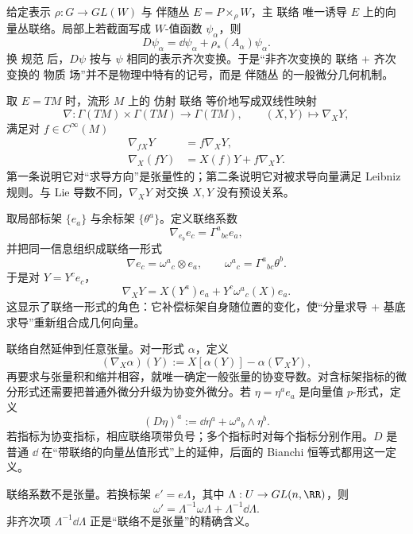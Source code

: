 给定表示 $\rho:G\to GL(W)$ 与 伴随丛 $E=P\times_\rho W$，主 联络 唯一诱导 $E$ 上的向量丛联络。局部上若截面写成 $W$-值函数 $\psi_\alpha$，则
\begin{equation*}D\psi_\alpha
=\dd\psi_\alpha+\rho_*(A_\alpha)\psi_\alpha.\end{equation*}
换 规范 后，$D\psi$ 按与 $\psi$ 相同的表示齐次变换。于是“非齐次变换的 联络 + 齐次变换的 物质 场”并不是物理中特有的记号，而是 伴随丛 的一般微分几何机制。

取 $E=TM$ 时，流形 $M$ 上的 仿射 联络 等价地写成双线性映射
\[
\nabla:\Gamma(TM)\times\Gamma(TM)\to\Gamma(TM),
\qquad
(X,Y)\mapsto\nabla_XY,
\]
满足对 $f\in C^\infty(M)$
\begin{align*}
\nabla_{fX}Y&=f\nabla_XY,\\
\nabla_X(fY)&=X(f)Y+f\nabla_XY.
\end{align*}
第一条说明它对“求导方向”是张量性的；第二条说明它对被求导向量满足 Leibniz 规则。与 Lie 导数不同，$\nabla_XY$ 对交换 $X,Y$ 没有预设关系。

取局部标架 $\{e_a\}$ 与余标架 $\{\theta^a\}$。定义联络系数
\begin{equation*}\nabla_{e_b}e_c=\Gamma^a{}_{bc}e_a,
\end{equation*}
并把同一信息组织成联络一形式
\begin{equation*}\nabla e_c=\omega^a{}_c\otimes e_a,
\qquad
\omega^a{}_c=\Gamma^a{}_{bc}\theta^b.
\end{equation*}
于是对 $Y=Y^ce_c$，
\[
\nabla_XY
=X(Y^a)e_a+Y^c\omega^a{}_c(X)e_a.
\]
这显示了联络一形式的角色：它补偿标架自身随位置的变化，使“分量求导 + 基底求导”重新组合成几何向量。

联络自然延伸到任意张量。对一形式 $\alpha$，定义
\[
(\nabla_X\alpha)(Y)
:=X[\alpha(Y)]-\alpha(\nabla_XY),
\]
再要求与张量积和缩并相容，就唯一确定一般张量的协变导数。对含标架指标的微分形式还需要把普通外微分升级为协变外微分。若 $\eta=\eta^ae_a$ 是向量值 $p$-形式，定义
\begin{equation}\label{eq:math-dg-exterior-covariant-derivative}
(D\eta)^a
:=\dd\eta^a+\omega^a{}_b\wedge\eta^b.
\end{equation}
若指标为协变指标，相应联络项带负号；多个指标时对每个指标分别作用。$D$ 是普通 $\dd$ 在“带联络的向量丛值形式”上的延伸，后面的 Bianchi 恒等式都用这一定义。

联络系数不是张量。若换标架 $e'=e\Lambda$，其中 $\Lambda:U\to GL(n,\RR)$，则
\begin{equation}\label{eq:math-dg-connection-gauge-transform}
{\omega'=\Lambda^{-1}\omega\Lambda+\Lambda^{-1}\dd\Lambda.}
\end{equation}
非齐次项 $\Lambda^{-1}\dd\Lambda$ 正是“联络不是张量”的精确含义。

